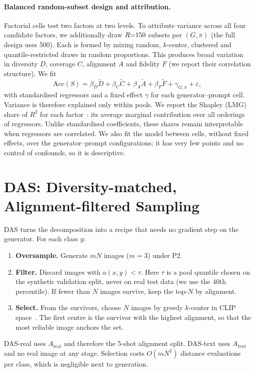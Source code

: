 \documentclass[10pt,twocolumn,letterpaper]{article}
\newcommand{\Areal}{A_{\text{real}}}
\newcommand{\Atext}{A_{\text{text}}}
\begin{document}
\paragraph{Balanced random-subset design and attribution.} Factorial cells test two factors at two levels. To attribute variance across all four candidate factors, we additionally draw $R{=}150$ subsets per $(G,\pi)$ (the full design uses 500). Each is formed by mixing random, $k$-center, clustered and quantile-restricted draws in random proportions. This produces broad variation in diversity $D$, coverage $C$, alignment $A$ and fidelity $F$ (we report their correlation structure). We fit
\begin{equation}
\text{Acc}(S)=\beta_D\tilde D+\beta_C\tilde C+\beta_A\tilde A+\beta_F\tilde F+\gamma_{G,\pi}+\varepsilon,
\end{equation}
with standardised regressors and a fixed effect $\gamma$ for each generator--prompt cell. Variance is therefore explained only within pools. We report the Shapley (LMG) share of $R^2$ for each factor~\cite{gromping2006relative,lipovetsky2001analysis}: its average marginal contribution over all orderings of regressors. Unlike standardised coefficients, these shares remain interpretable when regressors are correlated. We also fit the model between cells, without fixed effects, over the generator--prompt configurations; it has very few points and no control of confounds, so it is descriptive.

\section{DAS: Diversity-matched, Alignment-filtered Sampling}
DAS turns the decomposition into a recipe that needs no gradient step on the generator. For each class $y$:
\begin{enumerate}\setlength{\itemsep}{1pt}
\item \textbf{Oversample.} Generate $mN$ images ($m{=}3$) under P2.
\item \textbf{Filter.} Discard images with $a(x,y)<\tau$. Here $\tau$ is a pool quantile chosen on the synthetic validation split, never on real test data (we use the 40th percentile). If fewer than $N$ images survive, keep the top-$N$ by alignment.
\item \textbf{Select.} From the survivors, choose $N$ images by greedy $k$-center in CLIP space~\cite{gonzalez1985clustering,sener2018active}. The first centre is the survivor with the highest alignment, so that the most reliable image anchors the set.
\end{enumerate}
DAS-real uses $\Areal$ and therefore the 5-shot alignment split. DAS-text uses $\Atext$ and no real image at any stage. Selection costs $O(mN^2)$ distance evaluations per class, which is negligible next to generation.
\end{document}
